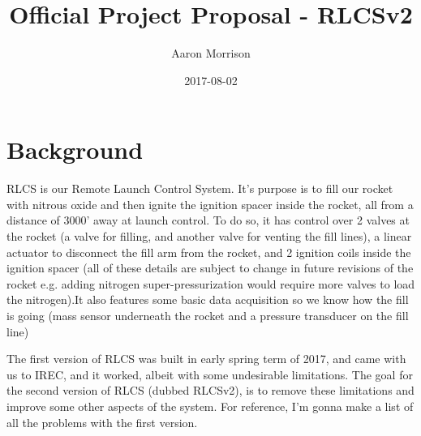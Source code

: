 \documentclass{article}
\title{Official Project Proposal - RLCSv2}
\author{Aaron Morrison}
\date{2017-08-02}
\begin{document}
    \maketitle
    \newpage

    \section{Background}
        RLCS is our Remote Launch Control System. It's purpose is to fill our rocket with nitrous oxide and then ignite the ignition spacer inside the rocket, all from a distance of 3000' away at launch control. To do so, it has control over 2 valves at the rocket (a valve for filling, and another valve for venting the fill lines), a linear actuator to disconnect the fill arm from the rocket, and 2 ignition coils inside the ignition spacer (all of these details are subject to change in future revisions of the rocket e.g. adding nitrogen super-pressurization would require more valves to load the nitrogen).It also features some basic data acquisition so we know how the fill is going (mass sensor underneath the rocket and a pressure transducer on the fill line)

        The first version of RLCS was built in early spring term of 2017, and came with us to IREC, and it worked, albeit with some undesirable limitations. The goal for the second version of RLCS (dubbed RLCSv2), is to remove these limitations and improve some other aspects of the system. For reference, I'm gonna make a list of all the problems with the first version.
\end{document}

